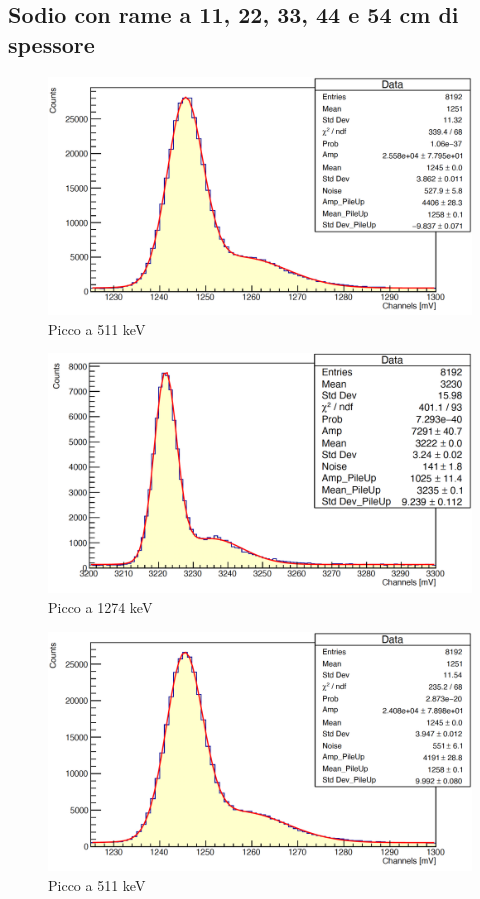 \documentclass[a4paper,10pt]{article}
\begin{document}
\subsection{Sodio con rame a 11, 22, 33, 44 e 54 cm di spessore}
\begin{figure}[H]
    \centering
    \includegraphics[scale=0.45]{appendice/spettri/NaCu1_11}
    \caption{Picco a 511 keV}
\end{figure}
\begin{figure}[H]
    \centering
    \includegraphics[scale=0.45]{appendice/spettri/NaCu2_11}
    \caption{Picco a 1274 keV}
\end{figure}
\begin{figure}[H]
    \centering
    \includegraphics[scale=0.45]{appendice/spettri/NaCu1_22}
    \caption{Picco a 511 keV}
\end{figure}
\end{document}
